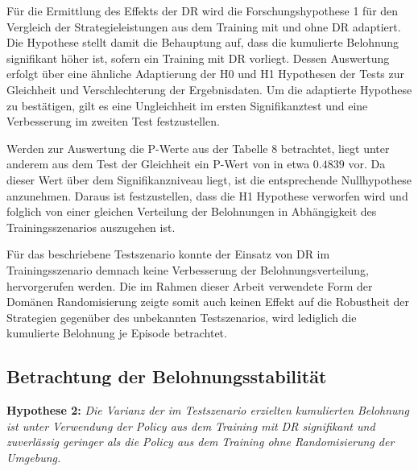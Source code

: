 Für die Ermittlung des Effekts der DR wird die Forschungshypothese 1 für den Vergleich der Strategieleistungen aus dem Training mit und ohne DR adaptiert.
Die Hypothese stellt damit die Behauptung auf, dass die kumulierte Belohnung signifikant höher ist, sofern ein Training mit DR vorliegt.
Dessen Auswertung erfolgt über eine ähnliche Adaptierung der H0 und H1 Hypothesen der Tests zur Gleichheit und Verschlechterung der Ergebnisdaten.
Um die adaptierte Hypothese zu bestätigen, gilt es eine Ungleichheit im ersten Signifikanztest und eine Verbesserung im zweiten Test festzustellen.

Werden zur Auswertung die P-Werte aus der Tabelle 8 betrachtet, liegt unter anderem aus dem Test der Gleichheit ein P-Wert von in etwa $0.4839$ vor.
Da dieser Wert über dem Signifikanzniveau liegt, ist die entsprechende Nullhypothese anzunehmen.
Daraus ist festzustellen, dass die H1 Hypothese verworfen wird und folglich von einer gleichen Verteilung der Belohnungen in Abhängigkeit des Trainingsszenarios auszugehen ist.

Für das beschriebene Testszenario konnte der Einsatz von DR im Trainingsszenario demnach keine Verbesserung der Belohnungsverteilung, hervorgerufen werden.
Die im Rahmen dieser Arbeit verwendete Form der Domänen Randomisierung zeigte somit auch keinen Effekt auf die Robustheit der Strategien gegenüber des unbekannten Testszenarios, wird lediglich die kumulierte Belohnung je Episode betrachtet.

\subsection{Betrachtung der Belohnungsstabilität}

\textbf{Hypothese 2:}
\textit{Die Varianz der im Testszenario erzielten kumulierten Belohnung ist unter Verwendung der Policy aus dem Training mit DR signifikant und zuverlässig geringer als die Policy aus dem Training ohne Randomisierung der Umgebung.}

